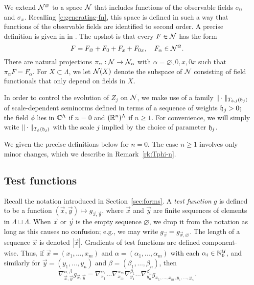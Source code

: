 We extend $\mathcal{N}^\varnothing$ to a space $\mathcal{N}$
that includes functions of the observable fields $\sigma_0$ and $\sigma_x$.
Recalling \eqref{e:generating-fn}, this space is defined in such a way that
functions of the observable fields are identified to second order. A precise
definition is given in
in \cite[Section~\ref{phi4-sec:phi4observables_representation}]{ST-phi4}.
The upshot is that every $F \in \mathcal{N}$ has the form
\begin{equation}
\label{e:obs-decomp}
F = F_\varnothing + F_0 + F_x + F_{0x},
	\quad
F_\alpha \in \mathcal{N}^\varnothing.
\end{equation}
There are natural projections $\pi_\alpha : \mathcal{N} \rightarrow \mathcal{N}_\alpha$ with
$\alpha = \varnothing, 0, x, 0x$ such that $\pi_\alpha F = F_\alpha$.
For $X \subset \Lambda$, we let $\mathcal{N}(X)$ denote the subspace of $\mathcal{N}$ consisting
of field functionals that only depend on fields in $X$.

In order to control the evolution of $Z_j$ on $\mathcal{N}$, we make use of a family
$\|\cdot\|_{T_{\phi,j}(\mathfrak{h}_j)}$ of scale-dependent seminorms defined in terms of a
sequence of weights $\mathfrak{h}_j > 0$; the field $\phi$ lies in $\mathbb{C}^\Lambda$ if $n = 0$ and
$({\mathbb R}^n)^\Lambda$ if $n \ge 1$. For convenience,
we will simply write $\|\cdot\|_{T_\phi(\mathfrak{h}_j)}$ with the scale $j$ implied by the
choice of parameter $\mathfrak{h}_j$.

We given the precise definitions below for $n = 0$. The case $n \ge 1$ involves only
minor changes, which we describe in Remark~\ref{rk:Tphi-n}.


\subsection{Test functions}

Recall the notation introduced in Section~\ref{sec:forms}.
A \emph{test function} $g$ is defined to be a function $(\vec x, \vec y) \mapsto g_{\vec x,\vec y}$,
where $\vec x$ and $\vec y$ are finite sequences of elements in $\Lambda \sqcup \bar\Lambda$.
When $\vec x$ or $\vec y$ is the empty sequence $\varnothing$,
we drop it from the notation as long as this causes no confusion;
e.g., we may write $g_{\vec x} = g_{\vec x,\varnothing}$.
The length of a sequence $\vec x$ is denoted $|\vec x|$.
Gradients of test functions are defined component-wise.
Thus, if $\vec x = (x_1, \ldots, x_m)$
and $\alpha = (\alpha_1, \ldots, \alpha_m)$
with each $\alpha_i \in {\mathbb N}_0^{\mathcal{U}}$, and similarly for $\vec y=(y_1,\ldots,y_n)$ and
$\beta=(\beta_1,\ldots,\beta_n)$,
then
\begin{equation}
\nabla^{\alpha,\beta}_{\vec x,\vec y} g_{\vec x,\vec y}
  =
\nabla^{\alpha_1}_{x_1} \ldots \nabla^{\alpha_m}_{x_m}
\nabla^{\beta_1}_{y_1} \ldots \nabla^{\beta_n}_{y_n}  g_{x_1,\ldots,x_m,y_1,\ldots,y_n}.
\end{equation}

